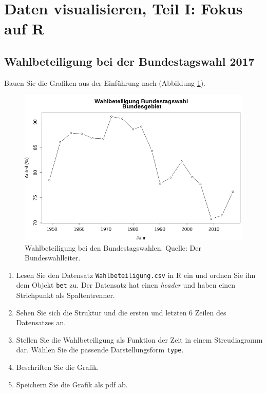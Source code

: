 \documentclass[]{book}
\providecommand{\tightlist}{%
  \setlength{\itemsep}{0pt}\setlength{\parskip}{0pt}}
\begin{document}
\hypertarget{daten-visualisieren-teil-i-fokus-auf-r}{%
\section{Daten visualisieren, Teil I: Fokus auf R}\label{daten-visualisieren-teil-i-fokus-auf-r}}

\hypertarget{wahlbeteiligung}{%
\subsection{Wahlbeteiligung bei der Bundestagswahl 2017}\label{wahlbeteiligung}}

Bauen Sie die Grafiken aus der Einführung nach (Abbildung \ref{fig:wahlbeteiligung}).

\begin{figure}
\includegraphics[width=1\linewidth]{Wahlbeteiligung} \caption{Wahlbeteiligung bei den Bundestagswahlen. Quelle: Der Bundeswahlleiter.}\label{fig:wahlbeteiligung}
\end{figure}

\begin{enumerate}
\def\labelenumi{\arabic{enumi}.}
\tightlist
\item
  Lesen Sie den Datensatz \texttt{Wahlbeteiligung.csv} in R ein und ordnen Sie ihn dem Objekt \texttt{bet} zu. Der Datensatz hat einen \emph{header} und haben einen Strichpunkt als Spaltentrenner.
\item
  Sehen Sie sich die Struktur und die ersten und letzten 6 Zeilen des Datensatzes an.
\item
  Stellen Sie die Wahlbeteiligung als Funktion der Zeit in einem Streudiagramm dar. Wählen Sie die passende Darstellungsform \texttt{type}.
\item
  Beschriften Sie die Grafik.
\item
  Speichern Sie die Grafik als pdf ab.
\end{enumerate}
\end{document}
